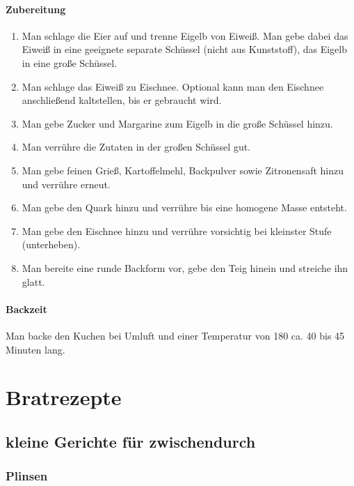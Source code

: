 \documentclass[a4paper]{book}
\begin{document}
\subsubsection{Zubereitung}
\begin{enumerate}[(1)]
	\item Man schlage die Eier auf und trenne Eigelb von Eiweiß. Man gebe dabei das Eiweiß in eine geeignete separate Schüssel (nicht aus Kunststoff), das Eigelb in eine große Schüssel.
	\item Man schlage das Eiweiß zu Eischnee. Optional kann man den Eischnee anschließend kaltstellen, bis er gebraucht wird.
	\item Man gebe Zucker und Margarine zum Eigelb in die große Schüssel hinzu.
	\item Man verrühre die Zutaten in der großen Schüssel gut.
	\item Man gebe feinen Grieß, Kartoffelmehl, Backpulver sowie Zitronensaft hinzu und verrühre erneut.
	\item Man gebe den Quark hinzu und verrühre bis eine homogene Masse entsteht.
	\item Man gebe den Eischnee hinzu und verrühre vorsichtig bei kleinster Stufe (unterheben).
	\item Man bereite eine runde Backform vor, gebe den Teig hinein und streiche ihn glatt.
\end{enumerate}
\subsubsection{Backzeit}
	Man backe den Kuchen bei Umluft und einer Temperatur von 180{\textcelsius} ca. 40 bis 45 Minuten lang.


\chapter{Bratrezepte}

\section{kleine Gerichte für zwischendurch}

\newpage
\subsection{Plinsen}
\end{document}
